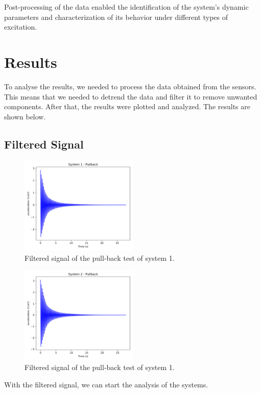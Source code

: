 \documentclass{article}  %
\begin{document}
Post-processing of the data enabled the identification of the system’s dynamic parameters and characterization of its behavior under different types of excitation.

\newpage
\section{Results}
To analyse the results, we needed to process the data obtained from the sensors. This means that we needed to detrend the data and filter it to remove unwanted components. After that, the results were plotted and analyzed. The results are shown below.
\subsection{Filtered Signal}
\begin{figure}[h]
  \centering
  \includegraphics[width=0.5\textwidth]{GRAFICOS/pullback_first.png}
  \caption{Filtered signal of the pull-back test of system 1.}
  \label{fig:filtered_signal1}
\end{figure}

\begin{figure}[h]
  \centering
  \includegraphics[width=0.5\textwidth]{GRAFICOS/pullback_second.png}
  \caption{Filtered signal of the pull-back test of system 1.}
  \label{fig:filtered_signal2}
\end{figure}

With the filtered signal, we can start the analysis of the systems.
\end{document}
